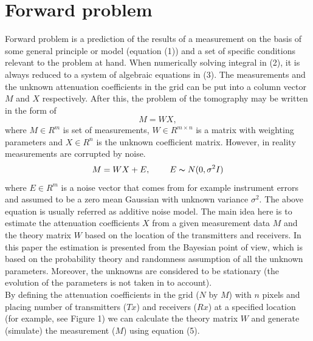 \documentclass[12pt,A4]{article}
\begin{document}
\section{Forward problem}
Forward problem is a prediction of the results of a measurement on the basis of some general principle or model (equation (1)) and a set of specific conditions relevant to the problem at hand. When numerically solving integral in (2), it is always reduced to a system of algebraic equations in (3). The measurements and the unknown attenuation coefficients in the grid can be put into a column vector $M$ and $X$ respectively. After this, the problem of the tomography may be written in the form of 
\begin{equation}
M=WX,
\end{equation}
where $M\in R^{m}$ is set of measurements, $W\in R^{m\times n}$ is a matrix with weighting parameters and $X\in R^{n}$ is the unknown coefficient matrix. However, in reality measurements are corrupted by noise.
\begin{equation}
M=WX +E,\hspace{0.8cm}E\thicksim N(0,\sigma^2I)
\end{equation}
where $E\in R^{m}$ is a noise vector that comes from for example instrument errors and assumed to be a zero mean Gaussian with unknown variance $\sigma ^{2}$. The above equation is usually referred as additive noise model. The main idea here is to estimate the attenuation coefficients $X$ from a given measurement data $M$ and the theory matrix $W$ based on the location of the transmitters and receivers. In this paper the estimation is presented from the Bayesian point of view, which is based on the probability theory and randomness assumption of all the unknown parameters. Moreover, the unknowns are considered to be stationary (the evolution of the parameters is not taken in to account).\\
By defining the attenuation coefficients in the grid ($N$ by $M$) with $n$ pixels and placing number of transmitters ($Tx$) and receivers ($Rx$) at a specified location (for example, see Figure 1) we can calculate the theory matrix $W$ and generate (simulate) the measurement ($M$) using equation (5). 
\end{document}
